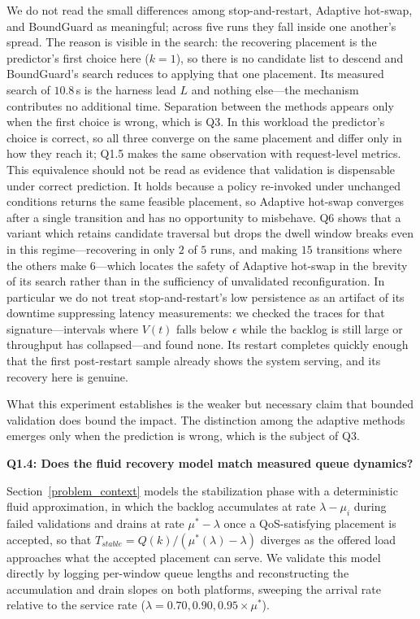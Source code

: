 \documentclass[conference]{IEEEtran}
\begin{document}
{{We do not read the small differences among stop-and-restart, Adaptive hot-swap, and BoundGuard as meaningful; across five runs they fall inside one another's spread. \textcolor{navyblue}{The reason is visible in the search: the recovering placement is the predictor's first choice here ($k=1$), so there is no candidate list to descend and BoundGuard's search reduces to applying that one placement. Its measured search of $10.8$\,s is the harness lead $L$ and nothing else---the mechanism contributes no additional time. Separation between the methods appears only when the first choice is wrong, which is Q3.} In this workload the predictor's choice is correct, so all three converge on the same placement and differ only in how they reach it; Q1.5 makes the same observation with request-level metrics. \textcolor{navyblue}{This equivalence should not be read as evidence that validation is dispensable under correct prediction. It holds because a policy re-invoked under unchanged conditions returns the same feasible placement, so Adaptive hot-swap converges after a single transition and has no opportunity to misbehave. Q6 shows that a variant which retains candidate traversal but drops the dwell window breaks even in this regime---recovering in only $2$ of $5$ runs, and making $15$ transitions where the others make $6$---which locates the safety of Adaptive hot-swap in the brevity of its search rather than in the sufficiency of unvalidated reconfiguration.} In particular we do not treat stop-and-restart's low persistence as an artifact of its downtime suppressing latency measurements: we checked the traces for that signature---intervals where $V(t)$ falls below $\epsilon$ while the backlog is still large or throughput has collapsed---and found none. Its restart completes quickly enough that the first post-restart sample already shows the system serving, and its recovery here is genuine.

What this experiment establishes is the weaker but necessary claim that bounded validation does bound the impact. The distinction among the adaptive methods emerges only when the prediction is wrong, which is the subject of Q3.}

{\color{navyblue}%
\vspace{0.5em}
\noindent\textbf{Q1.4: Does the fluid recovery model match measured queue dynamics?}

Section~\ref{problem_context} models the stabilization phase with a deterministic fluid approximation, in which the backlog accumulates at rate $\lambda-\mu_i$ during failed validations and drains at rate $\mu^{\ast}-\lambda$ once a QoS-satisfying placement is accepted, so that $T_{stable}=Q(k)/(\mu^{\ast}(\lambda)-\lambda)$ diverges as the offered load approaches what the accepted placement can serve. We validate this model directly by logging per-window queue lengths and reconstructing the accumulation and drain slopes on both platforms, sweeping the arrival rate relative to the service rate ($\lambda=0.70,0.90,0.95\times\mu^{\ast}$).

}}
\end{document}
